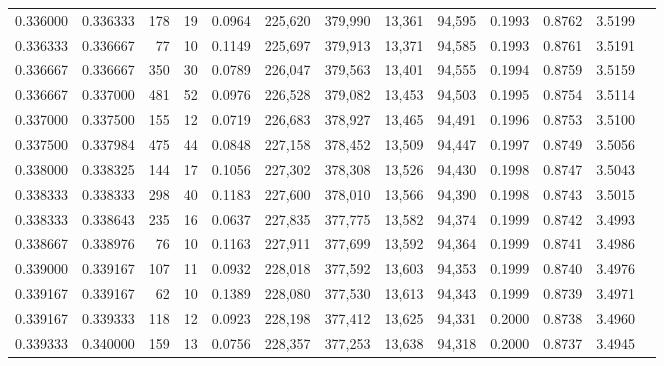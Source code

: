 \begin{tabular}{rrrrrrrrrrrrr}
0.336000 & 0.336333 &   178 &  19 &                                     0.0964 & 225,620 & 379,990 &  13,361 &  94,595 & 0.1993 & 0.8762 & 3.5199 \\
0.336333 & 0.336667 &    77 &  10 &                                     0.1149 & 225,697 & 379,913 &  13,371 &  94,585 & 0.1993 & 0.8761 & 3.5191 \\
0.336667 & 0.336667 &   350 &  30 &                                     0.0789 & 226,047 & 379,563 &  13,401 &  94,555 & 0.1994 & 0.8759 & 3.5159 \\
0.336667 & 0.337000 &   481 &  52 &                                     0.0976 & 226,528 & 379,082 &  13,453 &  94,503 & 0.1995 & 0.8754 & 3.5114 \\
0.337000 & 0.337500 &   155 &  12 &                                     0.0719 & 226,683 & 378,927 &  13,465 &  94,491 & 0.1996 & 0.8753 & 3.5100 \\
0.337500 & 0.337984 &   475 &  44 &                                     0.0848 & 227,158 & 378,452 &  13,509 &  94,447 & 0.1997 & 0.8749 & 3.5056 \\
0.338000 & 0.338325 &   144 &  17 &                                     0.1056 & 227,302 & 378,308 &  13,526 &  94,430 & 0.1998 & 0.8747 & 3.5043 \\
0.338333 & 0.338333 &   298 &  40 &                                     0.1183 & 227,600 & 378,010 &  13,566 &  94,390 & 0.1998 & 0.8743 & 3.5015 \\
0.338333 & 0.338643 &   235 &  16 &                                     0.0637 & 227,835 & 377,775 &  13,582 &  94,374 & 0.1999 & 0.8742 & 3.4993 \\
0.338667 & 0.338976 &    76 &  10 &                                     0.1163 & 227,911 & 377,699 &  13,592 &  94,364 & 0.1999 & 0.8741 & 3.4986 \\
0.339000 & 0.339167 &   107 &  11 &                                     0.0932 & 228,018 & 377,592 &  13,603 &  94,353 & 0.1999 & 0.8740 & 3.4976 \\
0.339167 & 0.339167 &    62 &  10 &                                     0.1389 & 228,080 & 377,530 &  13,613 &  94,343 & 0.1999 & 0.8739 & 3.4971 \\
0.339167 & 0.339333 &   118 &  12 &                                     0.0923 & 228,198 & 377,412 &  13,625 &  94,331 & 0.2000 & 0.8738 & 3.4960 \\
0.339333 & 0.340000 &   159 &  13 &                                     0.0756 & 228,357 & 377,253 &  13,638 &  94,318 & 0.2000 & 0.8737 & 3.4945 \\

\end{tabular}

